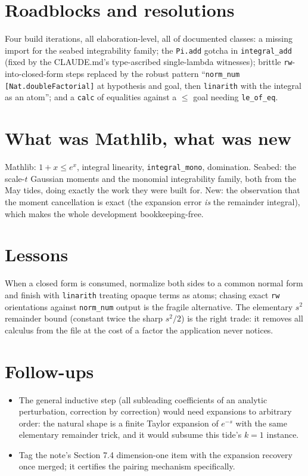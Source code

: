 \documentclass[11pt]{article}
\begin{document}
\section{Roadblocks and resolutions}

Four build iterations, all elaboration-level, all of documented classes:
a missing import for the seabed integrability family; the
\texttt{Pi.add} gotcha in \texttt{integral\_add} (fixed by the
CLAUDE.md's type-ascribed single-lambda witnesses); brittle
\texttt{rw}-into-closed-form steps replaced by the robust pattern
``\texttt{norm\_num [Nat.doubleFactorial]} at hypothesis and goal, then
\texttt{linarith} with the integral as an atom''; and a \texttt{calc} of
equalities against a $\leq$ goal needing \texttt{le\_of\_eq}.

\section{What was Mathlib, what was new}

Mathlib: $1 + x \leq e^x$, integral linearity, \texttt{integral\_mono},
domination. Seabed: the scale-$t$ Gaussian moments and the monomial
integrability family, both from the May tides, doing exactly the work
they were built for. New: the observation that the moment cancellation
is exact (the expansion error \emph{is} the remainder integral), which
makes the whole development bookkeeping-free.

\section{Lessons}

When a closed form is consumed, normalize both sides to a common normal
form and finish with \texttt{linarith} treating opaque terms as atoms;
chasing exact \texttt{rw} orientations against \texttt{norm\_num}
output is the fragile alternative. The elementary $s^2$ remainder bound
(constant twice the sharp $s^2/2$) is the right trade: it removes all
calculus from the file at the cost of a factor the application never
notices.

\section{Follow-ups}

\begin{itemize}
\item The general inductive step (all subleading coefficients of an
analytic perturbation, correction by correction) would need expansions
to arbitrary order: the natural shape is a finite Taylor expansion of
$e^{-s}$ with the same elementary remainder trick, and it would subsume
this tide's $k = 1$ instance.
\item Tag the note's Section 7.4 dimension-one item with the expansion
recovery once merged; it certifies the pairing mechanism specifically.
\end{itemize}
\end{document}
